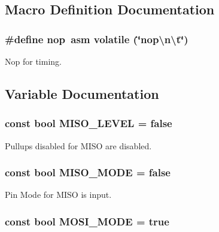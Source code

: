 \subsection{Macro Definition Documentation}
\hypertarget{group__soft_s_p_i_ga51158539d4d6022c9a445e78b0abfa94}{
\subsubsection[{nop}]{\setlength{\rightskip}{0pt plus 5cm}\#define nop~asm volatile (\char`\"{}nop\textbackslash{}n\textbackslash{}t\char`\"{})}}\label{group__soft_s_p_i_ga51158539d4d6022c9a445e78b0abfa94}
Nop for timing. 

\subsection{Variable Documentation}
\hypertarget{group__soft_s_p_i_ga5ed39ec843c7f42ec220a59c0b486718}{
\subsubsection[{M\-I\-S\-O\-\_\-\-L\-E\-V\-E\-L}]{\setlength{\rightskip}{0pt plus 5cm}const bool M\-I\-S\-O\-\_\-\-L\-E\-V\-E\-L = false}}\label{group__soft_s_p_i_ga5ed39ec843c7f42ec220a59c0b486718}
Pullups disabled for M\-I\-S\-O are disabled. \hypertarget{group__soft_s_p_i_gad7667379ccd35490d35bb159b1492ea2}{
\subsubsection[{M\-I\-S\-O\-\_\-\-M\-O\-D\-E}]{\setlength{\rightskip}{0pt plus 5cm}const bool M\-I\-S\-O\-\_\-\-M\-O\-D\-E = false}}\label{group__soft_s_p_i_gad7667379ccd35490d35bb159b1492ea2}
Pin Mode for M\-I\-S\-O is input. \hypertarget{group__soft_s_p_i_gadfe834b166b0ff6be3271f17420e72ec}{
\subsubsection[{M\-O\-S\-I\-\_\-\-M\-O\-D\-E}]{\setlength{\rightskip}{0pt plus 5cm}const bool M\-O\-S\-I\-\_\-\-M\-O\-D\-E = true}}\label{group__soft_s_p_i_gadfe834b166b0ff6be3271f17420e72ec}
